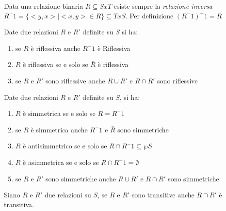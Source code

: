 Data una relazione binaria $R \subseteq S x T$ esiste sempre la \emph{relazione inversa}
$R^-1 = \{<y,x> | <x,y> \in R\} \subseteq T x S$.
Per definizione $(R ^ -1) ^ -1 = R$

\begin{defi}
Date due relazioni $R$ e $R'$ definite su $S$ si ha:
\begin{enumerate}
    \item se $R$ è riflessiva anche $R^-1$ è Riflessiva
    \item $R$ è riflessiva se e solo se $\bar{R}$ è riflessiva
    \item se $R$ e $R'$ sono riflessive anche $R \cup R'$ e $R \cap R'$ sono riflessive
\end{enumerate}
\end{defi}

\begin{defi}
Date due relazioni $R$ e $R'$ definite su $S$, si ha:
\begin{enumerate}
    \item $R$ è simmetrica se e solo se $R = R^-1$
    \item se $R$ è simmetrica anche $R^-1$ e $\bar{R}$ sono simmetriche
    \item $R$ è antisimmetrico se e solo se $R \cap R^-1 \subseteq \wp S$
    \item $R$ è asimmetrica se e solo se $R \cap R^-1 = \emptyset$
    \item se $R$ e $R'$ sono simmetriche anche $R \cup R'$ e $R \cap R'$ sono simmetriche
\end{enumerate}
\end{defi}

\begin{defi}
Siano $R$ e $R'$ due relazioni su $S$, se $R$ e $R'$ sono transitive anche $R \cap R'$ è transitiva.
\end{defi}

